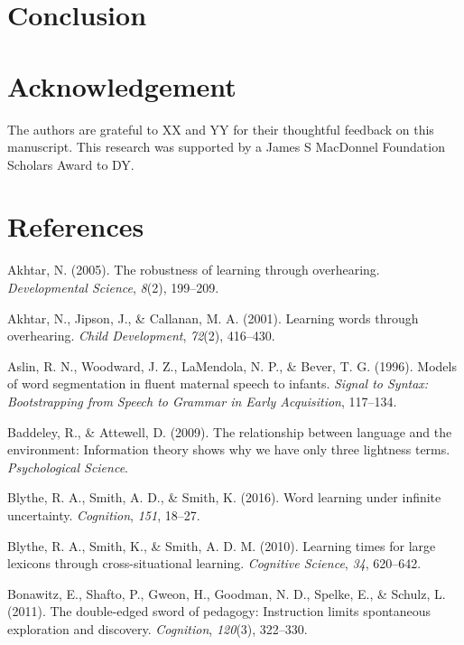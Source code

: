 \documentclass[english,floatsintext,man]{apa6}
\theoremstyle{definition}
\theoremstyle{definition}
\theoremstyle{definition}
\theoremstyle{remark}
\begin{document}
\section{Conclusion}\label{conclusion}

\section{Acknowledgement}\label{acknowledgement}

The authors are grateful to XX and YY for their thoughtful feedback on
this manuscript. This research was supported by a James S MacDonnel
Foundation Scholars Award to DY.

\newpage

\section{References}\label{references}

\setlength{\parindent}{-0.5in} \setlength{\leftskip}{0.5in}

\hypertarget{refs}{}
\hypertarget{ref-akhtar2005}{}
Akhtar, N. (2005). The robustness of learning through overhearing.
\emph{Developmental Science}, \emph{8}(2), 199--209.

\hypertarget{ref-akhtar2001}{}
Akhtar, N., Jipson, J., \& Callanan, M. A. (2001). Learning words
through overhearing. \emph{Child Development}, \emph{72}(2), 416--430.

\hypertarget{ref-aslin1996}{}
Aslin, R. N., Woodward, J. Z., LaMendola, N. P., \& Bever, T. G. (1996).
Models of word segmentation in fluent maternal speech to infants.
\emph{Signal to Syntax: Bootstrapping from Speech to Grammar in Early
Acquisition}, 117--134.

\hypertarget{ref-baddeley2009}{}
Baddeley, R., \& Attewell, D. (2009). The relationship between language
and the environment: Information theory shows why we have only three
lightness terms. \emph{Psychological Science}.

\hypertarget{ref-blythe2016}{}
Blythe, R. A., Smith, A. D., \& Smith, K. (2016). Word learning under
infinite uncertainty. \emph{Cognition}, \emph{151}, 18--27.

\hypertarget{ref-blythe2010}{}
Blythe, R. A., Smith, K., \& Smith, A. D. M. (2010). Learning times for
large lexicons through cross-situational learning. \emph{Cognitive
Science}, \emph{34}, 620--642.

\hypertarget{ref-bonawitz2011}{}
Bonawitz, E., Shafto, P., Gweon, H., Goodman, N. D., Spelke, E., \&
Schulz, L. (2011). The double-edged sword of pedagogy: Instruction
limits spontaneous exploration and discovery. \emph{Cognition},
\emph{120}(3), 322--330.
\end{document}
